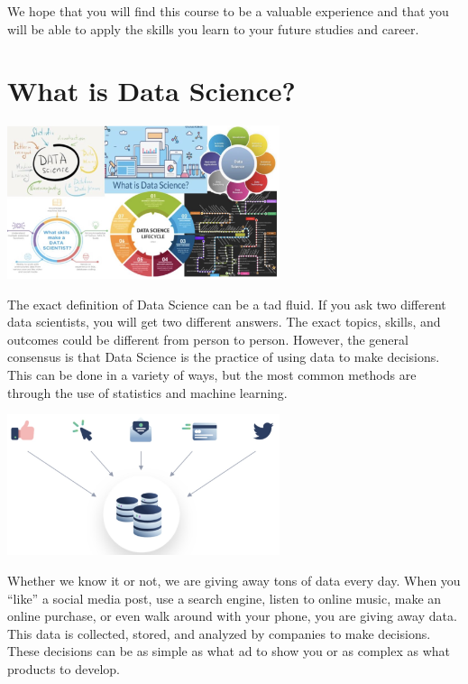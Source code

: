 \documentclass[
  letterpaper,
  DIV=11,
  numbers=noendperiod]{scrreprt}
\begin{document}
We hope that you will find this course to be a valuable experience and
that you will be able to apply the skills you learn to your future
studies and career.


\chapter*{What is Data Science?}\label{what-is-data-science}


\includegraphics[width=0.6\textwidth,height=\textheight]{./images/WIDS-1.jpg}

The exact definition of Data Science can be a tad fluid. If you ask two
different data scientists, you will get two different answers. The exact
topics, skills, and outcomes could be different from person to person.
However, the general consensus is that Data Science is the practice of
using data to make decisions. This can be done in a variety of ways, but
the most common methods are through the use of statistics and machine
learning.

\includegraphics[width=0.6\textwidth,height=\textheight]{./images/WIDS-2.jpg}

Whether we know it or not, we are giving away tons of data every day.
When you ``like'' a social media post, use a search engine, listen to
online music, make an online purchase, or even walk around with your
phone, you are giving away data. This data is collected, stored, and
analyzed by companies to make decisions. These decisions can be as
simple as what ad to show you or as complex as what products to develop.
\end{document}
